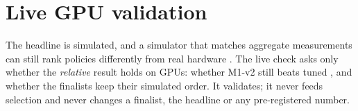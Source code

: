 %

\section{Live GPU validation}
\label{sec:live}

The headline is simulated, and a simulator that matches aggregate measurements can still rank
policies differently from real hardware \citep{tumkur2026calibrate,yan2020puffer}. The live check asks
only whether the \emph{relative} result holds on GPUs: whether M1-v2 still beats tuned
, and whether the finalists keep their simulated order. It validates; it never feeds
selection and never changes a finalist, the headline or any pre-registered number.

